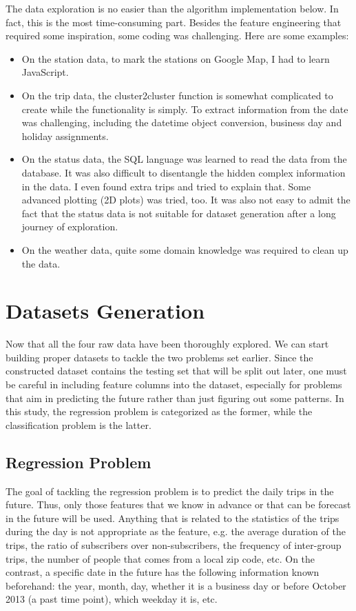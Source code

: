 \documentclass[a4paper]{article}
\begin{document}
		The data exploration is no easier than the algorithm implementation below. In fact, this is the most time-consuming part. Besides the feature engineering that required some inspiration, some coding was challenging. Here are some examples:
		
		\begin{itemize}
			\item On the station data, to mark the stations on Google Map, I had to learn JavaScript. 
			
			\item On the trip data, the cluster2cluster function is somewhat complicated to create while the functionality is simply. To extract information from the date was challenging, including the datetime object conversion, business day and holiday assignments. 
			
			\item On the status data, the SQL language was learned to read the data from the database. It was also difficult to disentangle the hidden complex information in the data. I even found extra trips and tried to explain that. Some advanced plotting (2D plots) was tried, too. It was also not easy to admit the fact that the status data is not suitable for dataset generation after a long journey of exploration.
			
			\item On the weather data, quite some domain knowledge was required to clean up the data. 
		\end{itemize}
				
\clearpage
	
	\section{Datasets Generation}
	Now that all the four raw data have been thoroughly explored. We can start building proper datasets to tackle the two problems set earlier. Since the constructed dataset contains the testing set that will be split out later, one must be careful in including feature columns into the dataset, especially for problems that aim in predicting the future rather than just figuring out some patterns. In this study, the regression problem is categorized as the former, while the classification problem is the latter.
	
		\subsection{Regression Problem}
		The goal of tackling the regression problem is to predict the daily trips in the future. Thus, only those features that we know in advance or that can be forecast in the future will be used. Anything that is related to the statistics of the trips during the day is not appropriate as the feature, e.g. the average duration of the trips, the ratio of subscribers over non-subscribers, the frequency of inter-group trips, the number of people that comes from a local zip code, etc. On the contrast, a specific date in the future has the following information known beforehand: the year, month, day, whether it is a business day or before October 2013 (a past time point), which weekday it is, etc. 
		
\end{document}
